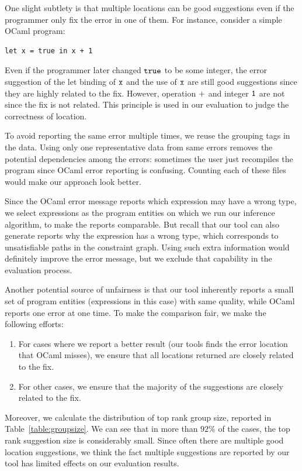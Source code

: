 One slight subtlety is that multiple locations can be good suggestions
even if the programmer only fix the error in one of them. For
instance, consider a simple OCaml program:
\begin{lstlisting}
let x = true in x + 1
\end{lstlisting}

Even if the programmer later changed $\mathtt{true}$ to be some integer,
the error suggestion of the let binding of $\mathtt{x}$ and the use of
$\mathtt{x}$ are still good suggestions since they are highly related to
the fix. However, operation $\mathtt{+}$ and integer $\mathtt{1}$ are not
since the fix is not related. This principle is used in our evaluation
to judge the correctness of location.

To avoid reporting the same error multiple times, we reuse the
grouping tags in the data. Using only one representative data from
same errors removes the potential dependencies among the errors:
sometimes the user just recompiles the program since OCaml error
reporting is confusing. Counting each of these files would make our
approach look better.

Since the OCaml error message reports which expression may have a wrong
type, we select expressions as the program entities on which we run our
inference algorithm, to make the reports comparable. But recall that
our tool can also generate reports why the expression has a wrong
type, which corresponds to unsatisfiable paths in the constraint
graph. Using such extra information would definitely improve the error
message, but we exclude that capability in the evaluation process.

Another potential source of unfairness is that our tool inherently
reports a small set of program entities (expressions in this case)
with same quality, while OCaml reports one error at one time. To make
the comparison fair, we make the following efforts:
\begin{enumerate}
\item For cases where we report a better result (our tools finds the
error location that OCaml misses), we ensure that all locations
returned are closely related to the fix.

\item For other cases, we ensure that the majority of the suggestions
are closely related to the fix. 
\end{enumerate}

Moreover, we calculate the distribution of top rank group size,
reported in Table~\ref{table:groupsize}. We can see that in more than
$92\%$ of the cases, the top rank suggestion size is considerably
small. Since often there are multiple good location suggestions,
we think the fact multiple suggestions are reported by our
tool has limited effects on our evaluation results.

